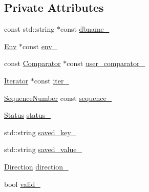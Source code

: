 \subsection*{Private Attributes}
\begin{DoxyCompactItemize}
\item 
const std\+::string $\ast$const \hyperlink{classleveldb_1_1anonymous__namespace_02db__iter_8cc_03_1_1_d_b_iter_a7246be546b528eac57ade0edec73da11}{dbname\+\_\+}
\item 
\hyperlink{classleveldb_1_1_env}{Env} $\ast$const \hyperlink{classleveldb_1_1anonymous__namespace_02db__iter_8cc_03_1_1_d_b_iter_aaa28248c085f5d542b30d44dfe96a606}{env\+\_\+}
\item 
const \hyperlink{structleveldb_1_1_comparator}{Comparator} $\ast$const \hyperlink{classleveldb_1_1anonymous__namespace_02db__iter_8cc_03_1_1_d_b_iter_a235c988747c2c2259c9de66a9950496e}{user\+\_\+comparator\+\_\+}
\item 
\hyperlink{classleveldb_1_1_iterator}{Iterator} $\ast$const \hyperlink{classleveldb_1_1anonymous__namespace_02db__iter_8cc_03_1_1_d_b_iter_aeed2814a4ed3b02242a24392cd876ddf}{iter\+\_\+}
\item 
\hyperlink{namespaceleveldb_a5481ededd221c36d652c371249f869fa}{Sequence\+Number} const \hyperlink{classleveldb_1_1anonymous__namespace_02db__iter_8cc_03_1_1_d_b_iter_a2900557bd9fc15837767a12544adfaaf}{sequence\+\_\+}
\item 
\hyperlink{classleveldb_1_1_status}{Status} \hyperlink{classleveldb_1_1anonymous__namespace_02db__iter_8cc_03_1_1_d_b_iter_a96aeebf50536a2cc97a5cae63256fdc0}{status\+\_\+}
\item 
std\+::string \hyperlink{classleveldb_1_1anonymous__namespace_02db__iter_8cc_03_1_1_d_b_iter_a6b0a51eb1b576f28b6eb20b21681dce5}{saved\+\_\+key\+\_\+}
\item 
std\+::string \hyperlink{classleveldb_1_1anonymous__namespace_02db__iter_8cc_03_1_1_d_b_iter_a4b03b30047cdc84ddc13fdf881b9d523}{saved\+\_\+value\+\_\+}
\item 
\hyperlink{classleveldb_1_1anonymous__namespace_02db__iter_8cc_03_1_1_d_b_iter_a8110fc354a165a0f317584cef2d903f7}{Direction} \hyperlink{classleveldb_1_1anonymous__namespace_02db__iter_8cc_03_1_1_d_b_iter_ab0d3488a45ba1d7332022dceb64471aa}{direction\+\_\+}
\item 
bool \hyperlink{classleveldb_1_1anonymous__namespace_02db__iter_8cc_03_1_1_d_b_iter_a647dfc231e50cc8d7b67e46ff66b47b1}{valid\+\_\+}
\end{DoxyCompactItemize}


